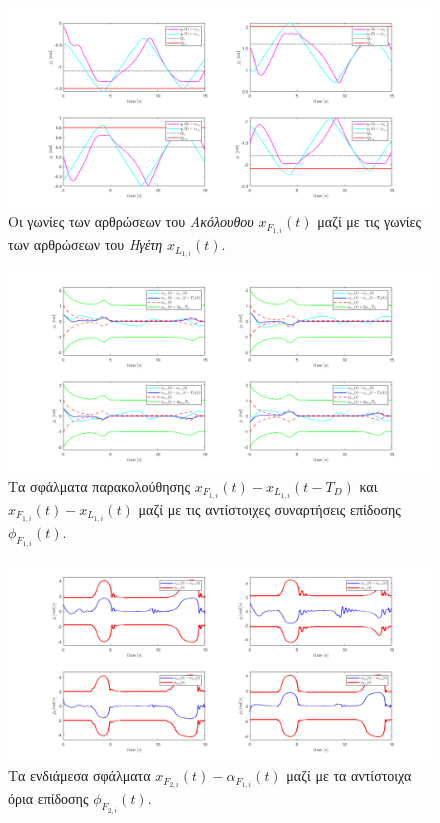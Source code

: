 \begin{figure}[H]
    \centering
    \includegraphics[width=1\linewidth]{Chapters/Chapter3/Figures/Sim1Fig2.png}
    \caption{Οι γωνίες των αρθρώσεων του \textit{Ακόλουθου} $x_{F_{1,i}}(t)$ μαζί με τις γωνίες των αρθρώσεων του \textit{Ηγέτη} $x_{L_{1,i}}(t)$.}
    \label{Sim1Fig2}
\end{figure}

\begin{figure}[H]
    \centering
    \includegraphics[width=1\linewidth]{Chapters/Chapter3/Figures/Sim1Fig3.png}
    \caption{Τα σφάλματα παρακολούθησης $x_{F_{1,i}}(t) - x_{L_{1,i}}(t - T_{D})$ και $x_{F_{1,i}}(t) - x_{L_{1,i}}(t)$ μαζί με τις αντίστοιχες συναρτήσεις επίδοσης $\phi_{F_{1,i}}(t)$.}
    \label{Sim1Fig3}
\end{figure}
\begin{figure}[!ht]
    \centering
    \includegraphics[width=1\linewidth]{Chapters/Chapter3/Figures/Sim1Fig4.png}
    \caption{Τα ενδιάμεσα σφάλματα $x_{F_{2,i}}(t) - \alpha_{F_{1,i}}(t)$ μαζί με τα αντίστοιχα όρια επίδοσης $\phi_{F_{2,i}}(t)$.}
    \label{Sim1Fig4}
\end{figure}

